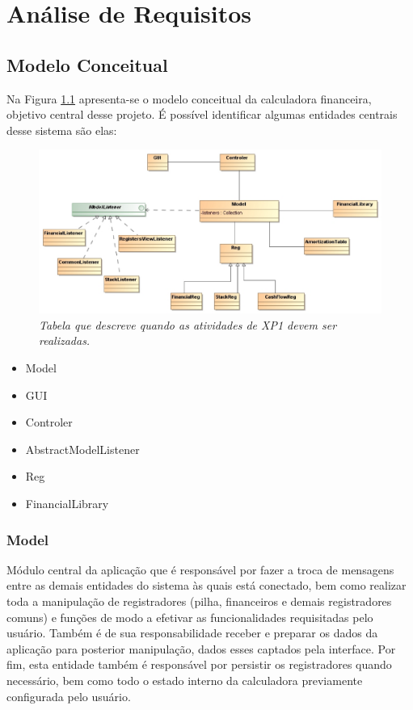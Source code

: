 \chapter{Análise de Requisitos}

\section{Modelo Conceitual}


Na Figura \ref{tab:modeConc} apresenta-se o modelo conceitual da calculadora financeira, objetivo central desse projeto. É possível identificar algumas entidades centrais desse sistema são elas:

\begin{figure}[!h]
 \includegraphics[scale=0.5]{CalcDC.eps}
 \caption{\it Tabela que descreve quando as atividades de XP1 devem ser realizadas.} \label{tab:modeConc}
\end{figure}

\begin{itemize}
	\item Model
	\item GUI
	\item Controler
	\item AbstractModelListener
	\item Reg
	\item FinancialLibrary
\end{itemize}

\subsection{Model}
Módulo central da aplicação que é responsável por fazer a troca de mensagens entre as demais entidades do sistema às quais está conectado, bem como realizar toda a manipulação de registradores (pilha, financeiros e demais registradores comuns) e funções de modo a efetivar as funcionalidades requisitadas pelo usuário. Também é de sua responsabilidade receber e preparar os dados da aplicação para posterior manipulação, dados esses captados pela interface. Por fim, esta entidade também é responsável por persistir os registradores quando necessário, bem como todo o estado interno da calculadora previamente configurada pelo usuário.

